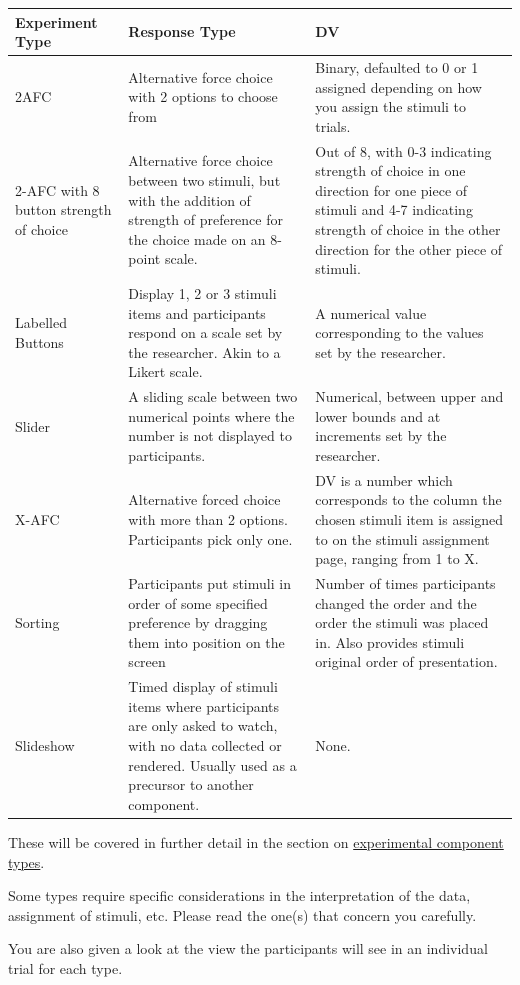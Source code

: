 \documentclass[]{book}
\begin{document}
\begin{tabular}{l|l|l}
\hline
Experiment Type & Response Type & DV\\
\hline
2AFC & Alternative force choice with 2 options to choose from & Binary, defaulted to 0 or 1 assigned depending on how you assign the stimuli to trials.\\
\hline
2-AFC with 8 button strength of choice & Alternative force choice between two stimuli, but with the addition of strength of preference for the choice made on an 8-point scale. & Out of 8, with 0-3 indicating strength of choice in one direction for one piece of stimuli and 4-7 indicating strength of choice in the other direction for the other piece of stimuli.\\
\hline
Labelled Buttons & Display 1, 2 or 3 stimuli items and participants respond on a scale set by the researcher. Akin to a Likert scale. & A numerical value corresponding to the values set by the researcher.\\
\hline
Slider & A sliding scale between two numerical points where the number is not displayed to participants. & Numerical, between upper and lower bounds and at increments set by the researcher.\\
\hline
X-AFC & Alternative forced choice with more than 2 options. Participants pick only one. & DV is a number which corresponds to the column the chosen stimuli item is assigned to on the stimuli assignment page, ranging from 1 to X.\\
\hline
Sorting & Participants put stimuli in order of some specified preference by dragging them into position on the screen & Number of times participants changed the order and the order the stimuli was placed in. Also provides stimuli original order of presentation.\\
\hline
Slideshow & Timed display of stimuli items where participants are only asked to watch, with no data collected or rendered. Usually used as a precursor to another component. & None.\\
\hline
\end{tabular}

These will be covered in further detail in the section on
\protect\hyperlink{exp_types}{experimental component types}.

Some types require specific considerations in the interpretation of the
data, assignment of stimuli, etc. Please read the one(s) that concern
you carefully.

You are also given a look at the view the participants will see in an
individual trial for each type.
\end{document}

